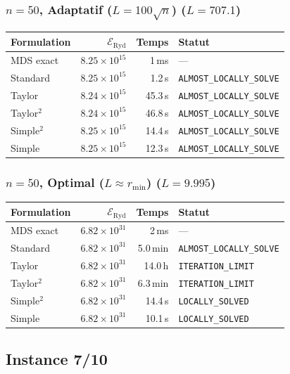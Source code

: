 \subsubsection{$n=50$, Adaptatif ($L{=}100\sqrt{n}$) ($L=707.1$)}
\begin{longtable}{@{}lrrl@{}}
  \toprule
  Formulation & $\mathcal{E}_{\mathrm{Ryd}}$ & Temps & Statut \\
  \midrule
  \endhead
  MDS exact & $8.25\times10^{15}$ & 1\,ms & --- \\
  Standard & $8.25\times10^{15}$ & 1.2\,s & \texttt{ALMOST\_LOCALLY\_SOLVE} \\
  Taylor & $8.24\times10^{15}$ & 45.3\,s & \texttt{ALMOST\_LOCALLY\_SOLVE} \\
  Taylor$^2$ & $8.24\times10^{15}$ & 46.8\,s & \texttt{ALMOST\_LOCALLY\_SOLVE} \\
  Simple$^2$ & $8.25\times10^{15}$ & 14.4\,s & \texttt{ALMOST\_LOCALLY\_SOLVE} \\
  Simple & $8.25\times10^{15}$ & 12.3\,s & \texttt{ALMOST\_LOCALLY\_SOLVE} \\
  \bottomrule
\end{longtable}

\subsubsection{$n=50$, Optimal ($L{\approx}r_{\min}$) ($L=9.995$)}
\begin{longtable}{@{}lrrl@{}}
  \toprule
  Formulation & $\mathcal{E}_{\mathrm{Ryd}}$ & Temps & Statut \\
  \midrule
  \endhead
  MDS exact & $6.82\times10^{31}$ & 2\,ms & --- \\
  Standard & $6.82\times10^{31}$ & 5.0\,min & \texttt{ALMOST\_LOCALLY\_SOLVE} \\
  Taylor & $6.82\times10^{31}$ & 14.0\,h & \texttt{ITERATION\_LIMIT} \\
  Taylor$^2$ & $6.82\times10^{31}$ & 6.3\,min & \texttt{ITERATION\_LIMIT} \\
  Simple$^2$ & $6.82\times10^{31}$ & 14.4\,s & \texttt{LOCALLY\_SOLVED} \\
  Simple & $6.82\times10^{31}$ & 10.1\,s & \texttt{LOCALLY\_SOLVED} \\
  \bottomrule
\end{longtable}

\subsection{Instance 7/10}
